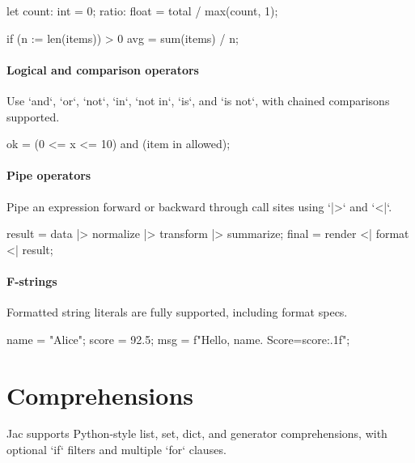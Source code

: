 \begin{jacblock}
let count: int = 0;
ratio: float = total / max(count, 1);

if (n := len(items)) > 0 {
    avg = sum(items) / n;
}
\end{jacblock}

\paragraph{Logical and comparison operators}

Use `and`, `or`, `not`, `in`, `not in`, `is`, and `is not`, with chained comparisons supported.

\begin{jacblock}
ok = (0 <= x <= 10) and (item in allowed);
\end{jacblock}

\paragraph{Pipe operators}

Pipe an expression forward or backward through call sites using `|>` and `<|`.

\begin{jacblock}
result = data |> normalize |> transform |> summarize;
final  = render <| format <| result;
\end{jacblock}

\paragraph{F-strings}

Formatted string literals are fully supported, including format specs.

\begin{jacblock}
name = "Alice"; score = 92.5;
msg = f"Hello, {name}. Score={score:.1f}";
\end{jacblock}

\section{Comprehensions}

Jac supports Python-style list, set, dict, and generator comprehensions, with optional `if` filters and multiple `for` clauses.


